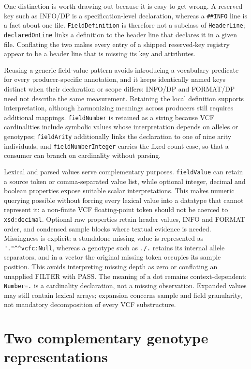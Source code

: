 \documentclass{ceurart}
\newcommand{\term}[1]{\texttt{#1}}
\begin{document}
One distinction is worth drawing out because it is easy to get wrong. A reserved key such as INFO/DP is a specification-level declaration, whereas a \term{\#\#INFO} line is a fact about one file. \term{FieldDefinition} is therefore not a subclass of \term{HeaderLine}; \term{declaredOnLine} links a definition to the header line that declares it in a given file. Conflating the two makes every entry of a shipped reserved-key registry appear to be a header line that is missing its key and attributes.

Reusing a generic field-value pattern avoids introducing a vocabulary predicate for every producer-specific annotation, and it keeps identically named keys distinct when their declaration or scope differs: INFO/DP and FORMAT/DP need not describe the same measurement. Retaining the local definition supports interpretation, although harmonizing meanings across producers still requires additional mappings. \term{fieldNumber} is retained as a string because VCF cardinalities include symbolic values whose interpretation depends on alleles or genotypes; \term{fieldArity} additionally links the declaration to one of nine arity individuals, and \term{fieldNumberInteger} carries the fixed-count case, so that a consumer can branch on cardinality without parsing.

Lexical and parsed values serve complementary purposes. \term{fieldValue} can retain a source token or comma-separated value list, while optional integer, decimal and boolean properties expose suitable scalar interpretations. This makes numeric querying possible without forcing every lexical value into a datatype that cannot represent it: a non-finite VCF floating-point token should not be coerced to \term{xsd:decimal}. Optional raw properties retain header values, INFO and FORMAT order, and condensed sample blocks where textual evidence is needed. Missingness is explicit: a standalone missing value is represented as \term{"."\textasciicircum{}\textasciicircum{}vcfc:Null}, whereas a genotype such as \term{./.} retains its internal allele separators, and in a vector the original missing token occupies its sample position. This avoids interpreting missing depth as zero or conflating an unapplied FILTER with PASS. The meaning of a dot remains context-dependent: \term{Number=.} is a cardinality declaration, not a missing observation. Expanded values may still contain lexical arrays; expansion concerns sample and field granularity, not mandatory decomposition of every VCF substructure.

\section{Two complementary genotype representations}
\label{sec:profiles}
\end{document}
